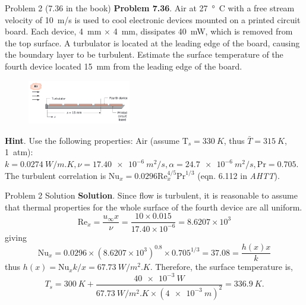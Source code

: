 \documentclass[9pt, aspectratio=169, handout]{beamer}
\begin{document}
\begin{frame}{Problem 2 (7.36 in the book)}
    \textbf{Problem 7.36}. Air at \SI{27}{\degree C} with a free stream velocity of \SI{10}{m/s} is used to cool electronic devices mounted on a printed circuit board. Each device, \SI{4}{mm} $\times$ \SI{4}{mm}, dissipates \SI{40}{mW}, which is removed from the top surface. A turbulator is located at the leading edge of the board, causing the boundary layer to be turbulent. Estimate the surface temperature of the fourth device located \SI{15}{mm} from the leading edge of the board.
    \begin{figure}
        \begin{center}
            \includegraphics[width=0.4\textwidth]{Figures/fig4.1.png}
        \end{center}
    \end{figure}
    \textbf{Hint}. Use the following properties: Air (assume $\mathrm{T}_s=\SI{330}{K}$, thus $\bar{T} = \SI{315}{K}$, \SI{1}{atm}): $k = \SI{0.0274}{W/m.K}, \nu=\SI{17.40e-6}{m^2/s}, \alpha=\SI{24.7e-6}{m^2/s}, \mathrm{Pr} = 0.705$. The turbulent correlation is $\mathrm{Nu}_x = 0.0296\mathrm{Re}_x^{4/5}\mathrm{Pr}^{1/3}$ (eqn. 6.112 in \textit{AHTT}).
\end{frame}

\begin{frame}{Problem 2 Solution}
    \textbf{Solution}. Since flow is turbulent, it is reasonable to assume that thermal properties for the whole surface of the fourth device are all uniform.
    \begin{equation}
        \mathrm{Re}_x = \frac{u_\infty x}{\nu} = \frac{10\times 0.015}{17.40\times 10^{-6}} = 8.6207\times 10^3
    \end{equation}
    giving
    \begin{equation}
        \mathrm{Nu}_x = 0.0296 \times (8.6207\times 10^3)^0.8 \times 0.705^{1/3} = 37.08 = \frac{h(x) x}{k}
    \end{equation}
    thus $h(x) = \mathrm{Nu}_x k / x = \SI{67.73}{W/m^2.K}$. Therefore, the surface temperature is,
    \begin{equation}
        T_s = \SI{300}{K} + \frac{\SI{40e-3}{W}}{\SI{67.73}{W/m^2.K}\times (\SI{4e-3}{m})^2} = \SI{336.9}{K}.
    \end{equation}
    \hfill\qedsymbol
\end{frame}
\end{document}
